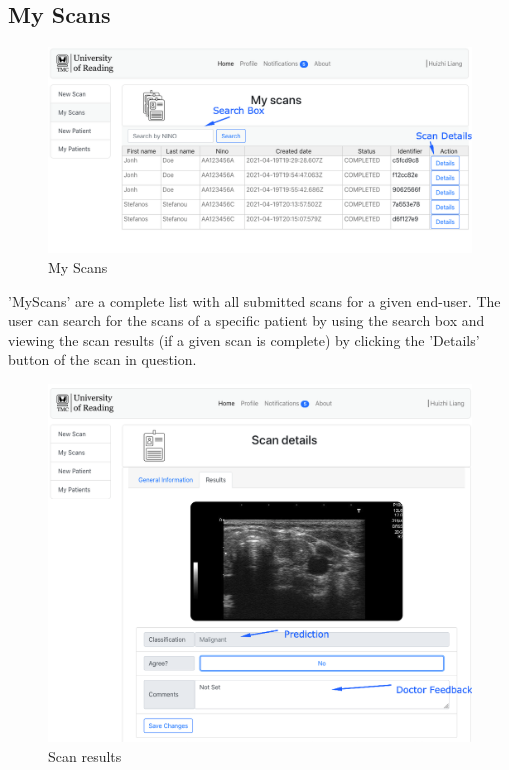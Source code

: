		\subsection{My Scans}
			\label{my-scans}
			\begin{figure}[H]
				\iftrue
				\centering
				\caption{My Scans}
				\includegraphics[scale=0.3]{figures/myscans}
				\fi
			\end{figure}
			'MyScans' are a complete list with all submitted scans for a given end-user. 
			The user can search for the scans of a specific patient by using the search box and viewing the 
			scan results (if a given scan is complete) by clicking the 'Details' button of the scan in question.
			\begin{figure}[H]
				\iftrue
				\centering
				\caption{Scan results}
				\includegraphics[scale=0.3]{figures/myscans-details}
				\fi
			\end{figure}

